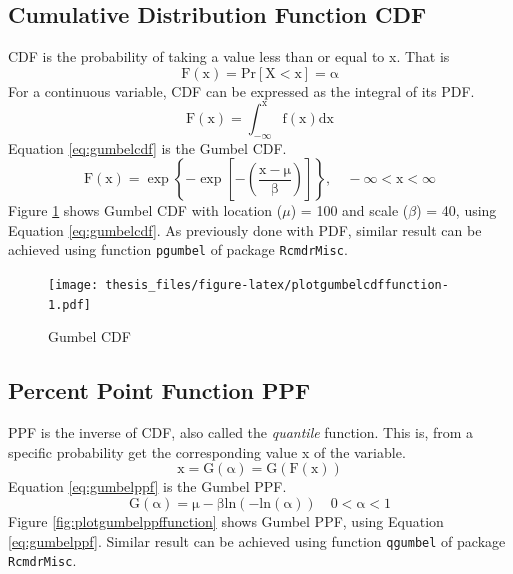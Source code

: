 \documentclass[12pt,twoside]{reedthesis}
\begin{document}
\hypertarget{cumulative-distribution-function-cdf}{%
\subsection{Cumulative Distribution Function CDF}\label{cumulative-distribution-function-cdf}}

CDF is the probability of taking a value less than or equal to x. That is
\begin{equation}
\mathrm{
        F(x) = Pr[X < x] = \alpha
       }
  \label{eq:cdf1}
\end{equation}
For a continuous variable, CDF can be expressed as the integral of its PDF.
\begin{equation}
\mathrm{
        F(x) = \int_{-\infty}^x f(x)dx
       }
  \label{eq:cdf2}
\end{equation}
Equation \eqref{eq:gumbelcdf} is the Gumbel CDF.
\begin{equation}
\mathrm{
        F(x) = \exp\left\{-\exp\left[-\left(\frac{x-\mu}{\beta}\right)\right]\right\}, 
        \quad -\infty < x < \infty
        }
  \label{eq:gumbelcdf}
\end{equation}
Figure \ref{fig:plotgumbelcdffunction} shows Gumbel CDF with location (\(\mu\)) = 100 and scale (\(\beta\)) = 40, using Equation \eqref{eq:gumbelcdf}. As previously done with PDF, similar result can be achieved using function \texttt{pgumbel} of package \texttt{RcmdrMisc}.

\footnotesize
\begin{figure}
\centering
\texttt{[image: thesis\_files/figure-latex/plotgumbelcdffunction-1.pdf]}
\caption{\label{fig:plotgumbelcdffunction}Gumbel CDF}
\end{figure}
\normalsize

\hypertarget{percent-point-function-ppf}{%
\subsection{Percent Point Function PPF}\label{percent-point-function-ppf}}

PPF is the inverse of CDF, also called the \emph{quantile} function. This is, from a specific probability get the corresponding value x of the variable.
\begin{equation}
\mathrm{
        x = G(\alpha) = G(F(x))
       }
  \label{eq:ppf}
\end{equation}
Equation \eqref{eq:gumbelppf} is the Gumbel PPF.
\begin{equation}
\mathrm{
        G(\alpha) = \mu-\beta ln(-ln(\alpha))
        \quad 0 < \alpha < 1
        }
  \label{eq:gumbelppf}
\end{equation}
Figure \ref{fig:plotgumbelppffunction} shows Gumbel PPF, using Equation \eqref{eq:gumbelppf}. Similar result can be achieved using function \texttt{qgumbel} of package \texttt{RcmdrMisc}.
\end{document}
